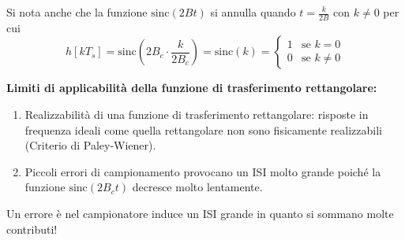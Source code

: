 \begin{enumerate}
\begin{center}
          \end{center}

          Si nota anche che la funzione $\text{sinc}(2Bt)$ si annulla quando $t = \frac{k}{2B}$ con $k \neq 0$ per cui
          \[
              h[kT_s] = \text{sinc} \left(2B_c\cdot\frac{k}{2B_c}\right) = \text{sinc}(k) = \left\{
              \begin{array}{ll}
                  1 & \text{se } k=0    \\
                  0 & \text{se } k\neq0
              \end{array}
              \right.
          \]
\end{enumerate}


\textbf{Limiti di applicabilità della funzione di trasferimento rettangolare:}

\begin{enumerate}
    \item Realizzabilità di una funzione di trasferimento rettangolare: risposte in frequenza ideali come quella rettangolare non sono fisicamente realizzabili (Criterio di Paley-Wiener).
    \item Piccoli errori di campionamento provocano un ISI molto grande poiché la funzione $\text{sinc}(2B_ct)$ decresce molto lentamente.
\end{enumerate}

Un errore è nel campionatore induce un ISI grande in quanto si sommano molte contributi!




